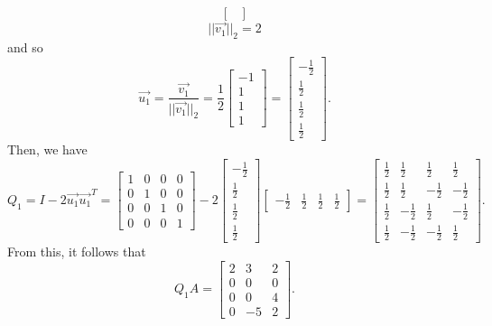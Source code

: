 \documentclass[letterpaper]{article}
\newcommand{\0}{\mathbf{0}}
\begin{document}
\begin{itemize}
\[\begin{bmatrix}
    \end{bmatrix}\] \[||\vec{v_1}||_2 = 2\] and so \[\vec{u_1} = \frac{\vec{v_1}}{||\vec{v_1}||_2} = \frac{1}{2} \begin{bmatrix}
        -1 \\ 1 \\ 1 \\ 1
    \end{bmatrix} = \begin{bmatrix}
        -\frac{1}{2} \\ \frac{1}{2} \\ \frac{1}{2} \\ \frac{1}{2}
    \end{bmatrix}.\] Then, we have \[Q_1 = I - 2\vec{u_1}\vec{u_1}^T = \begin{bmatrix}
        1 & 0 & 0 & 0 \\ 
        0 & 1 & 0 & 0 \\ 
        0 & 0 & 1 & 0 \\ 
        0 & 0 & 0 & 1
    \end{bmatrix} - 2 \begin{bmatrix}
        -\frac{1}{2} \\ \frac{1}{2} \\ \frac{1}{2} \\ \frac{1}{2}
    \end{bmatrix} \begin{bmatrix}
        -\frac{1}{2} & \frac{1}{2} & \frac{1}{2} & \frac{1}{2}
    \end{bmatrix} = \begin{bmatrix}
        \frac{1}{2} & \frac{1}{2} & \frac{1}{2} & \frac{1}{2} \\ 
        \frac{1}{2} & \frac{1}{2} & -\frac{1}{2} & -\frac{1}{2} \\ 
        \frac{1}{2} & -\frac{1}{2} & \frac{1}{2} & -\frac{1}{2} \\ 
        \frac{1}{2} & -\frac{1}{2} & -\frac{1}{2} & \frac{1}{2}
    \end{bmatrix}.\]
    From this, it follows that 
    \[Q_1 A = \begin{bmatrix}
        2 & 3 & 2 \\ 
        0 & 0 & 0 \\ 
        0 & 0 & 4 \\ 
        0 & -5 & 2
    \end{bmatrix}.\]




\end{itemize}
\end{document}
